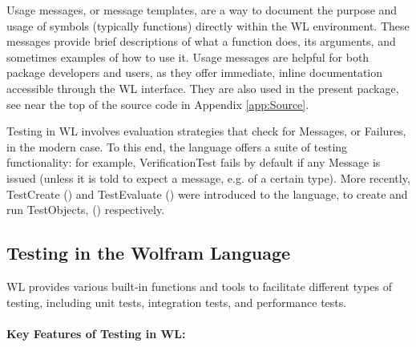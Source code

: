 Usage messages, or message templates, are a way to document the purpose and usage of symbols (typically functions) directly within the WL environment. These messages provide brief descriptions of what a function does, its arguments, and sometimes examples of how to use it. Usage messages are helpful for both package developers and users, as they offer immediate, inline documentation accessible through the WL interface. They are also used in the present package, see near the top of the source code in Appendix \ref{app:Source}.

Testing in WL involves evaluation strategies that check for Messages, or Failures, in the modern case. To this end, the language offers a suite of testing functionality: for example, VerificationTest fails by default if any Message is issued (unless it is told to expect a message, e.g. of a certain type). \cite{wolfram_research_inc_using_2024-1} More recently, TestCreate (\cite{wolfram_research_inc_testcreatewolfram_2024}) and TestEvaluate (\cite{wolfram_research_inc_testevaluatewolfram_2024}) were introduced to the language, to create and run TestObjects, (\cite{noauthor_testobjectwolfram_2024}) respectively.

\subsection{Testing in the Wolfram Language}

WL provides various built-in functions and tools to facilitate different types of testing, including unit tests, integration tests, and performance tests.

\paragraph{Key Features of Testing in WL:}

